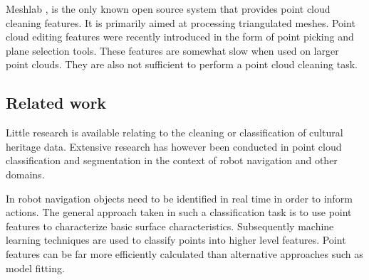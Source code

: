 \documentclass[10pt,twocolumn]{article}
\begin{document}
Meshlab \cite{VisualComputingLaboratory2012}, is the only known open source system that provides point cloud cleaning features. It is primarily aimed at processing triangulated meshes. Point cloud editing features were recently introduced in the form of point picking and plane selection tools. These features are somewhat slow when used on larger point clouds. They are also not sufficient to perform a point cloud cleaning task.







\subsection{Related work}



Little research is available relating to the cleaning or classification of cultural heritage data. Extensive research has however been conducted in point cloud classification and segmentation in the context of robot navigation and other domains.

In robot navigation objects need to be identified in real time in order to inform actions. The general approach taken in such a classification task is to use point features to characterize basic surface characteristics. Subsequently machine learning techniques are used to classify points into higher level features. Point features can be far more efficiently calculated than alternative approaches such as model fitting.
\end{document}
